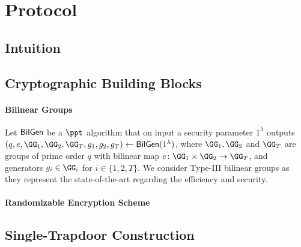 \section{Protocol}



\subsection{Intuition}

\subsection{Cryptographic Building Blocks}

\paragraph{Bilinear Groups} Let $\mathsf{BilGen}$ be a $\ppt$ algorithm that on input a security 
parameter $1^\lambda$ outputs $(q, e, \GG_1, \GG_2, \GG_T, g_1, g_2, g_T) \gets \BilGen
(1^\lambda)$, where $\GG_1, \GG_2$ and $\GG_T$ are groups of prime order $q$ with bilinear 
map $e \colon \GG_1 \times \GG_2 \to \GG_T$, and generators $g_i \in \GG_i$ for $i \in \{1,2,T\}$.
We consider Type-III bilinear groups as they represent the state-of-the-art regarding the 
efficiency and security.

\paragraph{Randomizable Encryption Scheme} 


\subsection{Single-Trapdoor Construction}

